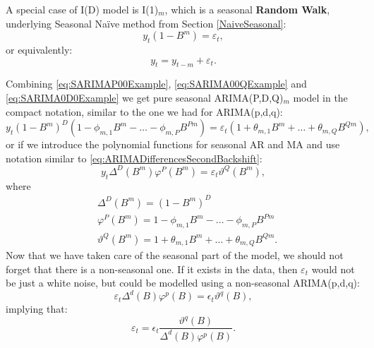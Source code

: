 \documentclass[
]{book}
\theoremstyle{definition}
\theoremstyle{definition}
\theoremstyle{definition}
\theoremstyle{definition}
\theoremstyle{remark}
\begin{document}
A special case of I(D) model is I(1)\(_m\), which is a seasonal \textbf{Random Walk}, underlying Seasonal Naïve method from Section \ref{NaiveSeasonal}:
\begin{equation}
  y_t (1-B^m) = \varepsilon_t,
  \label{eq:SARIMA010Example1}
\end{equation}
or equivalently:
\begin{equation}
  y_t = y_{t-m} + \varepsilon_t.
  \label{eq:SARIMA010Example2}
\end{equation}

Combining \eqref{eq:SARIMAP00Example}, \eqref{eq:SARIMA00QExample} and \eqref{eq:SARIMA0D0Example} we get pure seasonal ARIMA(P,D,Q)\(_m\) model in the compact notation, similar to the one we had for ARIMA(p,d,q):
\begin{equation}
  y_t (1-B^m)^D (1 -\phi_{m,1} B^m -\dots -\phi_{m,P} B^{Pm}) = \varepsilon_t (1 + \theta_{m,1} B^m + \dots + \theta_{m,Q} B^{Qm}),
  \label{eq:SARIMAPDQ}
\end{equation}
or if we introduce the polynomial functions for seasonal AR and MA and use notation similar to \eqref{eq:ARIMADifferencesSecondBackshift}:
\begin{equation}
  y_t \Delta^D(B^m) \varphi^P(B^m) = \varepsilon_t \vartheta^Q(B^m),
  \label{eq:SARIMAPDQCompact}
\end{equation}
where
\begin{equation}
\begin{aligned}
  & \Delta^D(B^m) = (1-B^m)^D \\
  & \varphi^P(B^m) = 1 -\phi_{m,1} B^m -\dots -\phi_{m,P} B^{Pm} \\ 
  & \vartheta^Q(B^m) = 1 + \theta_{m,1} B^m + \dots + \theta_{m,Q} B^{Qm} .
\end{aligned}
  \label{eq:SARIMAPolynomials}
\end{equation}
Now that we have taken care of the seasonal part of the model, we should not forget that there is a non-seasonal one. If it exists in the data, then \(\varepsilon_t\) would not be just a white noise, but could be modelled using a non-seasonal ARIMA(p,d,q):
\begin{equation}
  \varepsilon_t \Delta^d(B) \varphi^p(B) = \epsilon_t \vartheta^q(B),
  \label{eq:ARIMApdqForError}
\end{equation}
implying that:
\begin{equation}
  \varepsilon_t = \epsilon_t \frac{\vartheta^q(B)}{\Delta^d(B) \varphi^p(B)}.
  \label{eq:ARIMApdqForErrorRewritten}
\end{equation}
\end{document}
